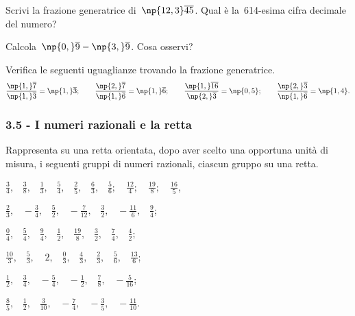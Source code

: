 \begin{esercizio}
\label{ese:3.30}
Scrivi la frazione generatrice di~$\np{12,3}\overline{45}$. Qual è la~614-esima cifra decimale del numero?
\end{esercizio}

\begin{esercizio}
\label{ese:3.31}
Calcola~$\np{0,}\overline{9}-\np{3,}\overline{9}$. Cosa osservi?
\end{esercizio}

\begin{esercizio}
\label{ese:3.32}
Verifica le seguenti uguaglianze trovando la frazione generatrice.
\[\frac{\np{1,}\overline{7}}{\np{1,}\overline{3}}=\np{1,}\overline{3};\qquad%
\frac{\np{2,}\overline{7}}{\np{1,}\overline{6}}=\np{1,}\overline{6};\qquad%
\frac{\np{1,}\overline{16}}{\np{2,}\overline{3}}=\np{0,5};\qquad%
\frac{\np{2,}\overline{3}}{\np{1,}\overline{6}}=\np{1,4}.\]
\end{esercizio}

\subsubsection*{3.5 - I numeri razionali e la retta}

\begin{esercizio}
 \label{ese:3.33}
Rappresenta su una retta orientata, dopo aver scelto una opportuna unità di misura,
i seguenti gruppi di numeri razionali, ciascun gruppo su una retta.
 \begin{enumeratea}
\spazielenx
 \item
 ${\displaystyle\frac{3}{4}\text{,}\quad\frac{3}{8}\text{,}\quad\frac{1}{3}\text{,}\quad\frac{5}{4}\text{,}\quad\frac{2}{5}\text{,}\quad\frac{6}{3}\text{,}\quad\frac{5}{6};\quad%
 \frac{12}{4};\quad\frac{19}{8};\quad\frac{16}{5}}$,
 \item $\displaystyle{\frac{2}{3}\text{,}\quad-\frac{3}{4}\text{,}\quad\frac{5}{2}\text{,}\quad-\frac{7}{12}\text{,}\quad\frac{3}{2}\text{,}\quad%
-\frac{11}{6}\text{,}\quad\frac{9}{4}}$;
 \item $\displaystyle{\frac{0}{4}\text{,}\quad\frac{5}{4}\text{,}\quad\frac{9}{4}\text{,}\quad\frac{1}{2}\text{,}\quad\frac{19}{8}\text{,}\quad\frac{3}{2}%
\text{,}\quad\frac{7}{4}\text{,}\quad\frac{4}{2}}$;
 \item $\displaystyle{\frac{10}{3}\text{,}\quad\frac{5}{3}\text{,}\quad~2\text{,}\quad\frac{0}{3}\text{,}\quad\frac{4}{3}\text{,}\quad\frac{2}{3}%
\text{,}\quad\frac{5}{6}\text{,}\quad\frac{13}{6}}$;
 \item $\displaystyle{\frac{1}{2}\text{,}\quad\frac{3}{4}\text{,}\quad-\frac{5}{4}\text{,}\quad-\frac{1}{2}\text{,}\quad\frac{7}{8}\text{,}%
\quad-\frac{5}{16}}$;
\item $\displaystyle{\frac{8}{5}\text{,}\quad\frac{1}{2}\text{,}\quad\frac{3}{10}\text{,}\quad-\frac{7}{4}\text{,}\quad-\frac{3}{5}%
\text{,}\quad-\frac{11}{10}}$.
 \end{enumeratea}
\end{esercizio}

